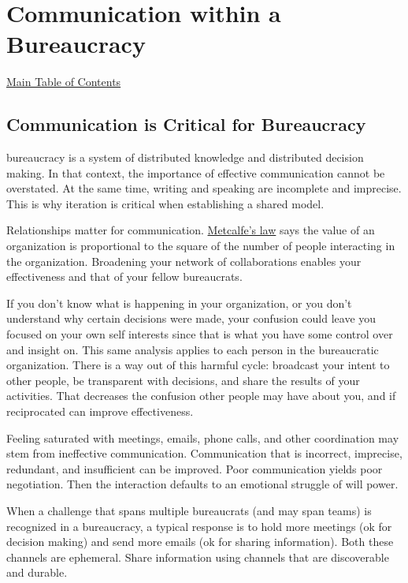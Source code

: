 \chapter{Communication within a Bureaucracy\label{sec:communication-within-bureaucracy}}
{\footnotesize\hyperref[sec:toc]{Main Table of Contents}}
\minitoc


\section{Communication is Critical for Bureaucracy}
\Gls{bureaucracy} is a system of distributed knowledge and distributed decision making. In that context, the importance of effective communication cannot be overstated. At the same time, writing and speaking are incomplete and imprecise. This is why iteration is critical when establishing a shared model.

Relationships matter for communication. 
\href{https://en.wikipedia.org/wiki/Metcalfe\%27s_law}{Metcalfe's law} says
the value of an organization is proportional to the square of the number of people interacting in the organization. Broadening your network of collaborations enables your effectiveness and that of your fellow bureaucrats. 

If you don't know what is happening in your organization, or you don't understand why certain decisions were made, your confusion could leave you focused on your own self interests since that is what you have some control over and insight on. This same analysis applies to each person in the bureaucratic organization. There is a way out of this harmful cycle: broadcast your intent to other people, be transparent with decisions, and share the results of your activities. That decreases the confusion other people may have about you, and if reciprocated can improve effectiveness. 

Feeling saturated with meetings, emails, phone calls, and other coordination may stem from ineffective communication. 
Communication that is incorrect, imprecise, redundant, and insufficient can be improved. 
Poor communication yields poor negotiation. Then the interaction defaults to an emotional struggle of will power. 

When a challenge that spans multiple bureaucrats (and may span teams) is recognized in a bureaucracy, a typical response is to hold more meetings (ok for decision making) and send more emails (ok for sharing information). Both these channels are ephemeral. Share information using channels that are discoverable and durable. 

